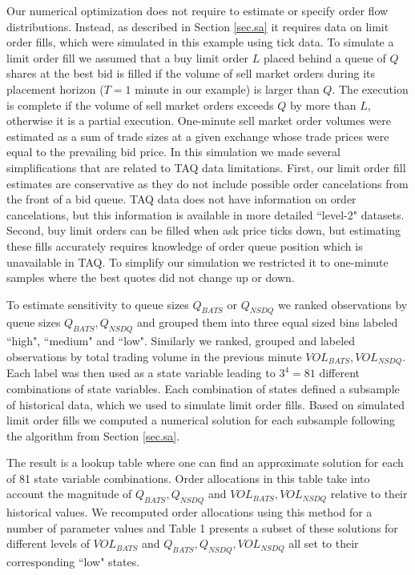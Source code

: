 \documentclass[opre,nonblindrev]{informs3}
\begin{document}
Our numerical optimization does not require to estimate or specify order flow distributions. Instead, as described in Section \ref{sec.sa} it requires data on limit order fills, which were simulated in this example using tick data. To simulate a limit order fill we assumed that a buy limit order $L$ placed behind a queue of $Q$ shares at the best bid is filled if the volume of sell market orders during its placement horizon ($T=1$ minute in our example) is larger than $Q$. The execution is complete if the volume of sell market orders exceeds $Q$ by more than $L$, otherwise it is a partial execution. One-minute sell market order volumes were estimated as a sum of trade sizes at a given exchange whose trade prices were equal to the prevailing bid price. In this simulation we made several simplifications that are related to TAQ data limitations. First, our limit order fill estimates are conservative as they do not include possible order cancelations from the front of a bid queue. TAQ data does not have information on order cancelations, but this information is available in more detailed ``level-2" datasets. Second, buy limit orders can be filled when ask price ticks down, but estimating these fills accurately requires knowledge of order queue position which is unavailable in TAQ. To simplify our simulation we restricted it to one-minute samples where the best quotes did not change up or down.

To estimate sensitivity to queue sizes $Q_{BATS}$ or $Q_{NSDQ}$ we ranked observations by queue sizes $Q_{BATS},Q_{NSDQ}$ and grouped them into three equal sized bins labeled ``high", ``medium" and ``low". Similarly we ranked, grouped and labeled observations by total trading volume in the previous minute $VOL_{BATS},VOL_{NSDQ}$. Each label was then used as a state variable leading to $3^4 = 81$ different combinations of state variables. Each combination of states defined a subsample of historical data, which we used to simulate limit order fills. Based on simulated limit order fills we computed a numerical solution for each subsample following the algorithm from Section \ref{sec.sa}.

The result is a lookup table where one can find an approximate solution for each of 81 state variable combinations. Order allocations in this table take into account the magnitude of $Q_{BATS},Q_{NSDQ}$ and $VOL_{BATS},VOL_{NSDQ}$ relative to their historical values. We recomputed order allocations using this method for a number of parameter values and Table 1 presents a subset of these solutions for different levels of  $VOL_{BATS}$ and $Q_{BATS},Q_{NSDQ},VOL_{NSDQ}$ all set to their corresponding ``low" states.
\end{document}
